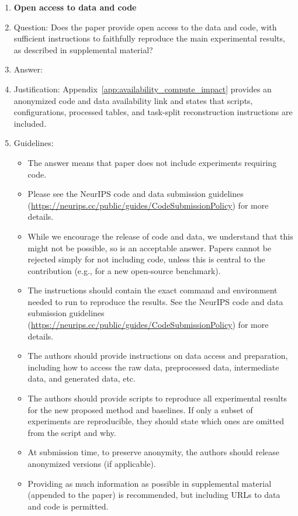 \documentclass{article}
\begin{document}
\begin{enumerate}
\item {\bf Open access to data and code}
    \item[] Question: Does the paper provide open access to the data and code, with sufficient instructions to faithfully reproduce the main experimental results, as described in supplemental material?
    \item[] Answer: \answerYes{} %
    \item[] Justification: Appendix~\ref{app:availability_compute_impact} provides an anonymized code and data availability link and states that scripts, configurations, processed tables, and task-split reconstruction instructions are included.
    \item[] Guidelines:
    \begin{itemize}
        \item The answer \answerNA{} means that paper does not include experiments requiring code.
        \item Please see the NeurIPS code and data submission guidelines (\url{https://neurips.cc/public/guides/CodeSubmissionPolicy}) for more details.
        \item While we encourage the release of code and data, we understand that this might not be possible, so \answerNo{} is an acceptable answer. Papers cannot be rejected simply for not including code, unless this is central to the contribution (e.g., for a new open-source benchmark).
        \item The instructions should contain the exact command and environment needed to run to reproduce the results. See the NeurIPS code and data submission guidelines (\url{https://neurips.cc/public/guides/CodeSubmissionPolicy}) for more details.
        \item The authors should provide instructions on data access and preparation, including how to access the raw data, preprocessed data, intermediate data, and generated data, etc.
        \item The authors should provide scripts to reproduce all experimental results for the new proposed method and baselines. If only a subset of experiments are reproducible, they should state which ones are omitted from the script and why.
        \item At submission time, to preserve anonymity, the authors should release anonymized versions (if applicable).
        \item Providing as much information as possible in supplemental material (appended to the paper) is recommended, but including URLs to data and code is permitted.
    \end{itemize}



\end{enumerate}
\end{document}
